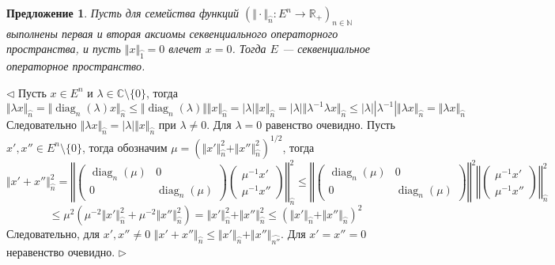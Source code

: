 \documentclass[12pt]{article}
\newtheorem{proposition}[theorem]{Предложение}
\newenvironment{proof}{\par $\triangleleft$}{$\triangleright$}
\begin{document}
\begin{proposition}\label{PrSQAxiomRed}
Пусть для семейства функций $(\Vert\cdot\Vert_{\wideparen{n}}:E^n\to\mathbb{R}_+)_{n\in\mathbb{N}}$ выполнены первая и вторая аксиомы секвенциального операторного пространства, и пусть $\Vert x\Vert_{\wideparen{1}}=0$ влечет $x=0$. 
Тогда $E$ --- секвенциальное операторное пространство.
\end{proposition}
\begin{proof}
Пусть $x\in E^n$ и $\lambda\in \mathbb{C}\setminus\{0\}$, тогда 
$$
\Vert\lambda x\Vert_{\wideparen{n}}
=\Vert\operatorname{diag}_n(\lambda)x\Vert_{\wideparen{n}}
\leq\Vert\operatorname{diag}_n(\lambda)\Vert\Vert x\Vert_{\wideparen{n}}
=|\lambda|\Vert x\Vert_{\wideparen{n}}
=|\lambda|\Vert\lambda^{-1}\lambda x\Vert_{\wideparen{n}}
\leq|\lambda||\lambda^{-1}|\Vert\lambda x\Vert_{\wideparen{n}}
=\Vert\lambda x\Vert_{\wideparen{n}}
$$
Следовательно $\Vert\lambda x\Vert_{\wideparen{n}}=|\lambda|\Vert x\Vert_{\wideparen{n}}$ при $\lambda\neq 0$. Для $\lambda=0$ равенство очевидно.
Пусть $x',x''\in E^n\setminus\{0\}$, тогда обозначим $\mu=(\Vert x'\Vert_{\wideparen{n}}^2+\Vert x''\Vert_{\wideparen{n}}^2)^{1/2}$, тогда
$$
\Vert x'+x''\Vert_{\wideparen{n}}^2
=\left\Vert\begin{pmatrix}\operatorname{diag}_n(\mu) & 0\\ 0 & \operatorname{diag}_n(\mu)\end{pmatrix}\begin{pmatrix}\mu^{-1}x'\\ \mu^{-1}x''\end{pmatrix}\right\Vert_{\wideparen{n}}^2
\leq\left\Vert\begin{pmatrix}\operatorname{diag}_n(\mu) & 0\\ 0 & \operatorname{diag}_n(\mu)\end{pmatrix}\right\Vert^2\left\Vert\begin{pmatrix}\mu^{-1}x'\\\mu^{-1}x''\end{pmatrix}\right\Vert_{\wideparen{n}}^2
$$
$$
\leq\mu^2(\mu^{-2}\Vert x'\Vert_{\wideparen{n}}^2+\mu^{-2}\Vert x''\Vert_{\wideparen{n}}^2)=\Vert x'\Vert_{\wideparen{n}}^2+\Vert x''\Vert_{\wideparen{n}}^2\leq (\Vert x'\Vert_{\wideparen{n}}+\Vert x''\Vert_{\wideparen{n}})^2
$$
Следовательно, для $x',x''\neq 0$ $\Vert x'+x''\Vert_{\wideparen{n}}\leq\Vert x'\Vert_{\wideparen{n}}+\Vert x''\Vert_{\wideparen{n''}}$. Для $x'=x''=0$ неравенство очевидно.
\end{proof}
\end{document}

